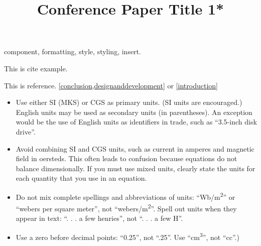 \documentclass[conference]{IEEEtran}
\begin{document}
\title{Conference Paper Title 1*\\
}



\maketitle



\begin{IEEEkeywords}
    component, formatting, style, styling, insert.
\end{IEEEkeywords}













This is cite example. \cite{IEEEexample:bluebookbook}

This is reference. \cref{conclusion,designanddevelopment} or \ref{introduction}
\newline
\begin{itemize}
    \item Use either SI (MKS) or CGS as primary units. (SI units are encouraged.) English units may be used as secondary units (in parentheses). An exception would be the use of English units as identifiers in trade, such as ``3.5-inch disk drive''.
    \item Avoid combining SI and CGS units, such as current in amperes and magnetic field in oersteds. This often leads to confusion because equations do not balance dimensionally. If you must use mixed units, clearly state the units for each quantity that you use in an equation.
    \item Do not mix complete spellings and abbreviations of units: ``Wb/m\textsuperscript{2}'' or ``webers per square meter'', not ``webers/m\textsuperscript{2}''. Spell out units when they appear in text: ``. . . a few henries'', not ``. . . a few H''.
    \item Use a zero before decimal points: ``0.25'', not ``.25''. Use ``cm\textsuperscript{3}'', not ``cc''.)
\end{itemize}
\end{document}
